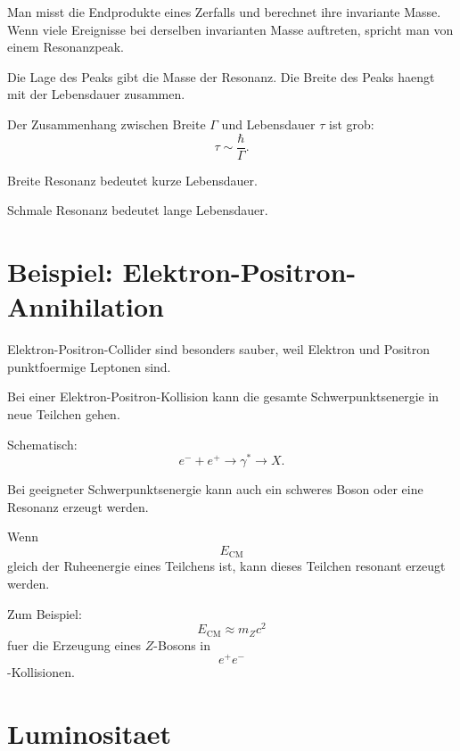 \begin{conceptbox}
Man misst die Endprodukte eines Zerfalls und berechnet ihre invariante Masse.
Wenn viele Ereignisse bei derselben invarianten Masse auftreten, spricht man von
einem Resonanzpeak.

Die Lage des Peaks gibt die Masse der Resonanz.
Die Breite des Peaks haengt mit der Lebensdauer zusammen.
\end{conceptbox}

\begin{formulabox}
Der Zusammenhang zwischen Breite $\Gamma$ und Lebensdauer $\tau$ ist grob:
\[
    \tau \sim \frac{\hbar}{\Gamma}.
\]
\end{formulabox}

\begin{examtipbox}
Breite Resonanz bedeutet kurze Lebensdauer.

Schmale Resonanz bedeutet lange Lebensdauer.
\end{examtipbox}

\section{Beispiel: Elektron-Positron-Annihilation}

Elektron-Positron-Collider sind besonders sauber, weil Elektron und Positron
punktfoermige Leptonen sind.

\begin{conceptbox}
Bei einer Elektron-Positron-Kollision kann die gesamte Schwerpunktsenergie in neue
Teilchen gehen.

Schematisch:
\[
    e^- + e^+ \rightarrow \gamma^* \rightarrow X.
\]

Bei geeigneter Schwerpunktsenergie kann auch ein schweres Boson oder eine Resonanz
erzeugt werden.
\end{conceptbox}

\begin{examplebox}
Wenn
\[
    E_{\mathrm{CM}}
\]
gleich der Ruheenergie eines Teilchens ist, kann dieses Teilchen resonant erzeugt
werden.

Zum Beispiel:
\[
    E_{\mathrm{CM}} \approx m_Zc^2
\]
fuer die Erzeugung eines $Z$-Bosons in
\[
    e^+e^-
\]
-Kollisionen.
\end{examplebox}

\section{Luminositaet}

